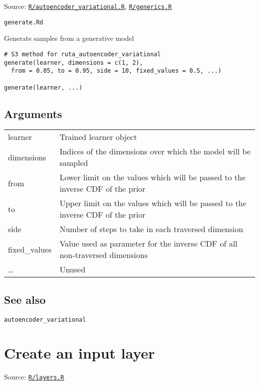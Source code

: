 Source:
\href{https://github.com/fdavidcl/ruta/blob/master/R/autoencoder_variational.R}{\texttt{R/autoencoder\_variational.R}},
\href{https://github.com/fdavidcl/ruta/blob/master/R/generics.R}{\texttt{R/generics.R}}

\texttt{generate.Rd}

Generate samples from a generative model

\begin{verbatim}
# S3 method for ruta_autoencoder_variational
generate(learner, dimensions = c(1, 2),
  from = 0.05, to = 0.95, side = 10, fixed_values = 0.5, ...)

generate(learner, ...)
\end{verbatim}

\hypertarget{arguments}{\subsection{\texorpdfstring{\protect\hyperlink{arguments}{}Arguments}{Arguments}}\label{arguments}}

\begin{longtable}[c]{@{}>{\small}p{3cm}>{\raggedright}p{12.5cm}@{}}
\toprule
learner & Trained learner object\tabularnewline
dimensions & Indices of the dimensions over which the model will be
sampled\tabularnewline
from & Lower limit on the values which will be passed to the inverse CDF
of the prior\tabularnewline
to & Upper limit on the values which will be passed to the inverse CDF
of the prior\tabularnewline
side & Number of steps to take in each traversed
dimension\tabularnewline
fixed\_values & Value used as parameter for the inverse CDF of all
non-traversed dimensions\tabularnewline
\ldots{} & Unused\tabularnewline
\bottomrule
\end{longtable}

\hypertarget{see-also}{\subsection{\texorpdfstring{\protect\hyperlink{see-also}{}See
also}{See also}}\label{see-also}}

\texttt{autoencoder\_variational}

\section{Create an input layer}\label{create-an-input-layer}

Source:
\href{https://github.com/fdavidcl/ruta/blob/master/R/layers.R}{\texttt{R/layers.R}}

